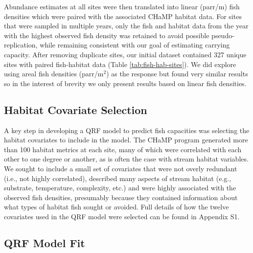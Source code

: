 \documentclass[
  12pt,
]{article}
\begin{document}
Abundance estimates at all sites were then translated into linear (parr/m) fish densities which were paired with the associated CHaMP habitat data. For sites that were sampled in multiple years, only the fish and habitat data from the year with the highest observed fish density was retained to avoid possible pseudo-replication, while remaining consistent with our goal of estimating carrying capacity. After removing duplicate sites, our initial dataset contained 327 unique sites with paired fish-habitat data (Table \ref{tab:fish-hab-sites}). We did explore using areal fish densities (parr/m\(^2\)) as the response but found very similar results so in the interest of brevity we only present results based on linear fish densities.

\hypertarget{habitat-covariate-selection}{%
\subsection{Habitat Covariate Selection}\label{habitat-covariate-selection}}

A key step in developing a QRF model to predict fish capacities was selecting the habitat covariates to include in the model. The CHaMP program generated more than 100 habitat metrics at each site, many of which were correlated with each other to one degree or another, as is often the case with stream habitat variables. We sought to include a small set of covariates that were not overly redundant (i.e., not highly correlated), described many aspects of stream habitat (e.g., substrate, temperature, complexity, etc.) and were highly associated with the observed fish densities, presumably because they contained information about what types of habitat fish sought or avoided. Full details of how the twelve covariates used in the QRF model were selected can be found in Appendix S1.

\hypertarget{qrf-model-fit}{%
\subsection{QRF Model Fit}\label{qrf-model-fit}}
\end{document}
